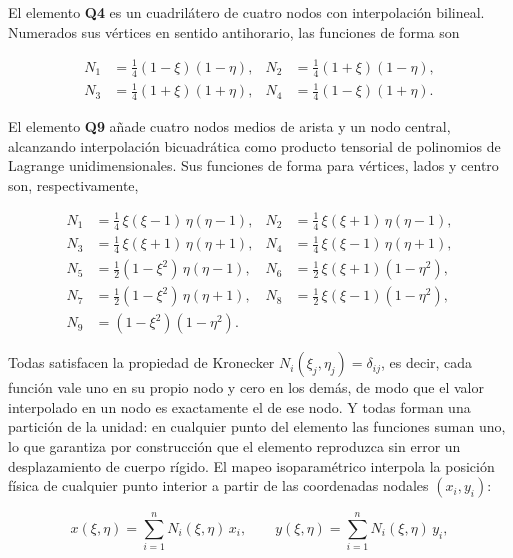 El elemento \textbf{Q4} es un cuadrilátero de cuatro nodos con interpolación bilineal. Numerados sus vértices en sentido antihorario, las funciones de forma son

\begin{equation}
\begin{aligned}
N_1 &= \tfrac{1}{4}(1-\xi)(1-\eta), & N_2 &= \tfrac{1}{4}(1+\xi)(1-\eta), \\
N_3 &= \tfrac{1}{4}(1+\xi)(1+\eta), & N_4 &= \tfrac{1}{4}(1-\xi)(1+\eta).
\end{aligned}
\label{eq:N-q4}
\end{equation}

El elemento \textbf{Q9} añade cuatro nodos medios de arista y un nodo central, alcanzando interpolación bicuadrática como producto tensorial de polinomios de Lagrange unidimensionales. Sus funciones de forma para vértices, lados y centro son, respectivamente,

\begin{equation}
\begin{aligned}
N_1 &= \tfrac{1}{4}\,\xi(\xi-1)\,\eta(\eta-1), & N_2 &= \tfrac{1}{4}\,\xi(\xi+1)\,\eta(\eta-1), \\
N_3 &= \tfrac{1}{4}\,\xi(\xi+1)\,\eta(\eta+1), & N_4 &= \tfrac{1}{4}\,\xi(\xi-1)\,\eta(\eta+1), \\
N_5 &= \tfrac{1}{2}(1-\xi^2)\,\eta(\eta-1), & N_6 &= \tfrac{1}{2}\,\xi(\xi+1)(1-\eta^2), \\
N_7 &= \tfrac{1}{2}(1-\xi^2)\,\eta(\eta+1), & N_8 &= \tfrac{1}{2}\,\xi(\xi-1)(1-\eta^2), \\
N_9 &= (1-\xi^2)(1-\eta^2). &&
\end{aligned}
\label{eq:N-q9}
\end{equation}

Todas satisfacen la propiedad de Kronecker $N_i(\xi_j, \eta_j) = \delta_{ij}$, es decir, cada función vale uno en su propio nodo y cero en los demás, de modo que el valor interpolado en un nodo es exactamente el de ese nodo. Y todas forman una partición de la unidad: en cualquier punto del elemento las funciones suman uno, lo que garantiza por construcción que el elemento reproduzca sin error un desplazamiento de cuerpo rígido. El mapeo isoparamétrico interpola la posición física de cualquier punto interior a partir de las coordenadas nodales $(x_i, y_i)$:

\begin{equation}
x(\xi, \eta) = \sum_{i=1}^{n} N_i(\xi, \eta)\,x_i, \qquad
y(\xi, \eta) = \sum_{i=1}^{n} N_i(\xi, \eta)\,y_i,
\label{eq:mapeo-iso}
\end{equation}

